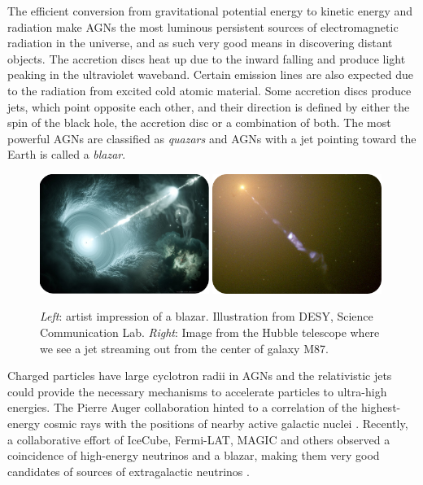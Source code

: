 The efficient conversion from gravitational potential energy to kinetic energy and radiation make AGNs the most luminous persistent sources of electromagnetic radiation in the universe, and as such very good means in discovering distant objects. The accretion discs heat up due to the inward falling and produce light peaking in the ultraviolet waveband. Certain emission lines are also expected due to the radiation from excited cold atomic material. Some accretion discs produce jets, which point opposite each other, and their direction is defined by either the spin of the black hole, the accretion disc or a combination of both.  The most powerful AGNs are classified as \textit{quazars} and AGNs with a jet pointing toward the Earth is called a \textit{blazar}.

\begin{figure}
\centering
\includegraphics[width=0.49\textwidth]{chapter3/img/quazar_resized_rounded_resized_2.jpg}
\includegraphics[width=0.49\textwidth]{chapter3/img/jet_crop_rounded.jpg}
\caption{\textit{Left}: artist impression of a blazar. Illustration from DESY, Science Communication Lab. \textit{Right}: Image from the Hubble telescope where we see a jet streaming out from the center of galaxy M87.}
\end{figure}

Charged particles have large cyclotron radii in AGNs and the relativistic jets could provide the necessary mechanisms to accelerate particles to ultra-high energies. The Pierre Auger collaboration hinted to a correlation of the highest-energy cosmic rays with the positions of nearby active galactic nuclei \cite{Abraham:2007si}. Recently, a collaborative effort of IceCube, Fermi-LAT, MAGIC and others observed a coincidence of high-energy neutrinos and a blazar, making them very good candidates of sources of extragalactic neutrinos \cite{IceCube:2018dnn}.

